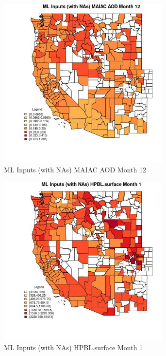 \begin{figure} 
\centering  
\includegraphics[width=0.77\textwidth]{Code_Outputs/Report_ML_input_PM25_Step4_part_f_de_duplicated_aves_prioritize_24hr_obswNAs_CountyMAIAC_AODmedianMonth12.jpg} 
\caption{\label{fig:Report_ML_input_PM25_Step4_part_f_de_duplicated_aves_prioritize_24hr_obswNAsCountyMAIAC_AODmedianMonth12}ML Inputs (with NAs) MAIAC AOD Month 12} 
\end{figure} 
 

\begin{figure} 
\centering  
\includegraphics[width=0.77\textwidth]{Code_Outputs/Report_ML_input_PM25_Step4_part_f_de_duplicated_aves_prioritize_24hr_obswNAs_CountyHPBLsurfacemedianMonth1.jpg} 
\caption{\label{fig:Report_ML_input_PM25_Step4_part_f_de_duplicated_aves_prioritize_24hr_obswNAsCountyHPBLsurfacemedianMonth1}ML Inputs (with NAs) HPBL.surface Month 1} 
\end{figure} 
 

